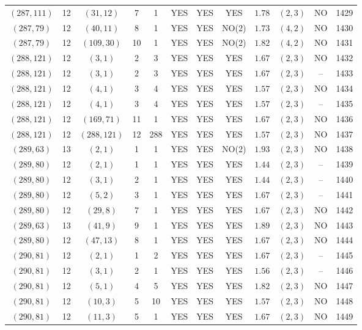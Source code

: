 \begin{longtable}{|c|c|c|c|c|c|c|c|c|c|c|c|}
$(287,111)$ & 12 & $(31,12)$ & 7 & 1 & YES & YES & YES & $1.78$ & $(2,3)$ & NO & 1429\\
$(287,79)$ & 12 & $(40,11)$ & 8 & 1 & YES & YES & NO(2) & $1.73$ & $(4,2)$ & NO & 1430\\
$(287,79)$ & 12 & $(109,30)$ & 10 & 1 & YES & YES & NO(2) & $1.82$ & $(4,2)$ & NO & 1431\\
$(288,121)$ & 12 & $(3,1)$ & 2 & 3 & YES & YES & YES & $1.67$ & $(2,3)$ & NO & 1432\\
$(288,121)$ & 12 & $(3,1)$ & 2 & 3 & YES & YES & YES & $1.67$ & $(2,3)$ & -- & 1433\\
$(288,121)$ & 12 & $(4,1)$ & 3 & 4 & YES & YES & YES & $1.57$ & $(2,3)$ & NO & 1434\\
$(288,121)$ & 12 & $(4,1)$ & 3 & 4 & YES & YES & YES & $1.57$ & $(2,3)$ & -- & 1435\\
$(288,121)$ & 12 & $(169,71)$ & 11 & 1 & YES & YES & YES & $1.67$ & $(2,3)$ & NO & 1436\\
$(288,121)$ & 12 & $(288,121)$ & 12 & 288 & YES & YES & YES & $1.57$ & $(2,3)$ & NO & 1437\\
$(289,63)$ & 13 & $(2,1)$ & 1 & 1 & YES & YES & NO(2) & $1.93$ & $(2,3)$ & NO & 1438\\
$(289,80)$ & 12 & $(2,1)$ & 1 & 1 & YES & YES & YES & $1.44$ & $(2,3)$ & -- & 1439\\
$(289,80)$ & 12 & $(3,1)$ & 2 & 1 & YES & YES & YES & $1.44$ & $(2,3)$ & -- & 1440\\
$(289,80)$ & 12 & $(5,2)$ & 3 & 1 & YES & YES & YES & $1.67$ & $(2,3)$ & -- & 1441\\
$(289,80)$ & 12 & $(29,8)$ & 7 & 1 & YES & YES & YES & $1.67$ & $(2,3)$ & NO & 1442\\
$(289,63)$ & 13 & $(41,9)$ & 9 & 1 & YES & YES & YES & $1.89$ & $(2,3)$ & NO & 1443\\
$(289,80)$ & 12 & $(47,13)$ & 8 & 1 & YES & YES & YES & $1.67$ & $(2,3)$ & NO & 1444\\
$(290,81)$ & 12 & $(2,1)$ & 1 & 2 & YES & YES & YES & $1.67$ & $(2,3)$ & -- & 1445\\
$(290,81)$ & 12 & $(3,1)$ & 2 & 1 & YES & YES & YES & $1.56$ & $(2,3)$ & -- & 1446\\
$(290,81)$ & 12 & $(5,1)$ & 4 & 5 & YES & YES & YES & $1.82$ & $(2,3)$ & NO & 1447\\
$(290,81)$ & 12 & $(10,3)$ & 5 & 10 & YES & YES & YES & $1.57$ & $(2,3)$ & NO & 1448\\
$(290,81)$ & 12 & $(11,3)$ & 5 & 1 & YES & YES & YES & $1.67$ & $(2,3)$ & NO & 1449\\

\end{longtable}
